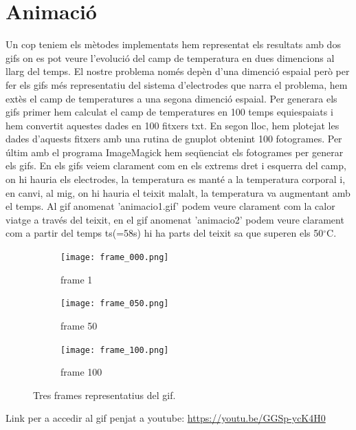 \documentclass[11pt]{article}
\begin{document}
\section{Animació}
Un cop teniem els mètodes implementats hem representat els resultats amb dos gifs on es pot veure l'evolució del camp de temperatura en dues dimencions al llarg del temps. El nostre problema només depèn d'una dimenció espaial però per fer els gifs més representatiu del sistema d'electrodes que narra el problema, hem extès el camp de temperatures a una segona dimenció espaial. 
Per generara els gifs primer hem calculat el camp de temperatures en 100 temps equiespaiats i hem convertit aquestes dades en 100 fitxers txt. En segon lloc, hem plotejat les dades d'aquests fitxers amb una rutina de gnuplot obtenint 100 fotogrames. Per últim amb el programa ImageMagick hem seqüenciat els fotogrames per generar els gifs.
En els gifs veiem clarament com en els extrems dret i esquerra del camp, on hi hauria els electrodes, la temperatura es manté a la temperatura corporal i, en canvi, al mig, on hi hauria el teixit malalt, la temperatura va augmentant amb el temps. Al gif anomenat 'animacio1.gif' podem veure clarament com la calor viatge a través del teixit, en el gif anomenat 'animacio2' podem veure clarament com a partir del temps ts(=58s) hi ha parts del teixit sa que superen els 50$^\circ$C.



\begin{figure}[hbt!]
    \centering
    \begin{subfigure}{0.3\textwidth}
        \centering
        \texttt{[image: frame\_000.png]}
        \caption{frame 1}
    \end{subfigure}
    \hspace{0.01\textwidth}
    \begin{subfigure}{0.3\textwidth}
        \centering
        \texttt{[image: frame\_050.png]}
        \caption{frame 50}
    \end{subfigure}
    \hspace{0.01\textwidth}
    \begin{subfigure}{0.3\textwidth}
        \centering
        \texttt{[image: frame\_100.png]}
        \caption{frame 100}
    \end{subfigure}

    \caption{Tres frames representatius del gif.}
    \label{fig:dues_imatges}
\end{figure}

Link per a accedir al gif penjat a youtube: \url{https://youtu.be/GGSp-ycK4H0}
\end{document}
